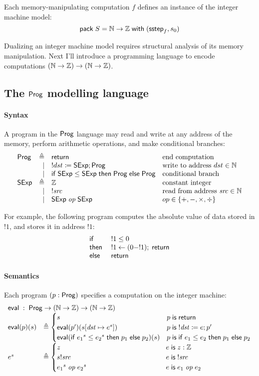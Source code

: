 Each memory-manipulating computation $f$ defines an instance of the integer
machine model:
\[\mathsf{pack}\;S=\mathbb N\to\mathbb Z\;\mathsf{with}\;(\mathsf{sstep}_f,s_0)\]

Dualizing an integer machine model requires structural analysis of its memory
manipulation.  Next I'll introduce a programming language to encode computations
$(\mathbb N\to\mathbb Z)\to(\mathbb N\to\mathbb Z)$.

\subsection{The $\mathsf{Prog}$ modelling language}
\label{sec:prog-lang}
\paragraph{Syntax}
A program in the $\mathsf{Prog}$ language may read and write at any address of the
memory, perform arithmetic operations, and make conditional branches:
\[\begin{array}{lrll}
\Prog&\triangleq&\Return&\text{end computation}\\
&\mid&!dst\coloneqq\Sexp;\Prog&\text{write to address }dst\in\Nat\\\null
&\mid&\If\Sexp\le\Sexp\Then\Prog\Else\Prog&\text{conditional branch}\\
\Sexp&\triangleq&\Int&\text{constant integer}\\
&\mid&!\src&\text{read from address }\src\in\Nat\\
&\mid&\Sexp\oop\Sexp&op\in\{+,-,\times,\div\}
\end{array}\]

For example, the following program computes the absolute value of data stored in
$!1$, and stores it in address $!1$:
\[\begin{array}{ll}
  \mathsf{if}\;&!1\le0\\
  \mathsf{then}\;&!1\gets(0-!1);\;\mathsf{return}\\
  \mathsf{else}\;&\mathsf{return}
\end{array}\]

\paragraph{Semantics}
Each program $(p:\mathsf{Prog})$ specifies a computation on the integer machine:
\[\begin{array}{ll}
\multicolumn{2}{l}{\Eval\;:\;\Prog\to(\Nat\to\Int)\to(\Nat\to\Int)}\\
\Eval(p)(s)&\triangleq
\begin{cases}
  s&p\Is\Return\\
  \Eval(p')(\update{s}{\dst}{e^s})&p\Is !\dst\coloneqq e;p'\\
  \Eval(\If {e_1}^s\le{e_2}^s\Then p_1\Else p_2)(s)&p\Is\If e_1\le e_2\Then p_1\Else p_2
\end{cases}\\
e^s&\triangleq
\begin{cases}
  z\hphantom{\Exec(\If {e_1}^s\le{e_2}^s\Then p_1\Else p_2,)}&e\Is z:\Int\\
  s!\src&e\Is !\src\\
  {e_1}^s\oop{e_2}^s&e\Is e_1\oop e_2
\end{cases}
\end{array}\]

